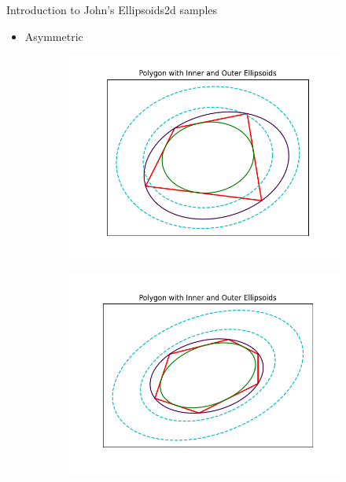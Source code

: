 \documentclass[
  english,            %
  aspectratio=169,    %
]{tumbeamer}
\begin{document}
\begin{frame}{Introduction to John's Ellipsoids}{2d samples}
  \begin{itemize}
    \item Asymmetric
  \end{itemize}
  \begin{figure}
      \centering
      \begin{subfigure}[b]{0.4\textwidth}
        \includegraphics[width=\textwidth]{plots/asym_1.png}
      \end{subfigure}
      \begin{subfigure}[b]{0.4\textwidth}
        \includegraphics[width=\textwidth]{plots/asym_2.png}
      \end{subfigure}
       \label{fig:enter-label}
  \end{figure}
\end{frame}
\end{document}
